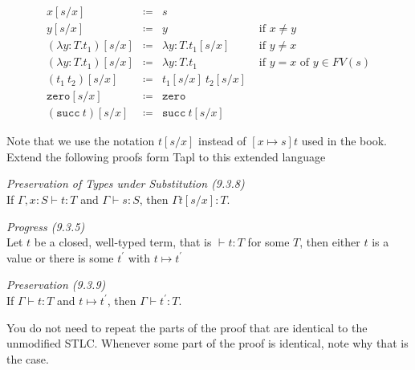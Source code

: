 \begin{minipage}{\textwidth}
  \begin{minipage}{0.5\textwidth}
    \begin{prooftree}
    \end{prooftree}
  \end{minipage}
  \hfill
  \begin{minipage}{0.4\textwidth}
    \begin{prooftree}
    \end{prooftree}
  \end{minipage}
  \hfill
\end{minipage}
\hfill

\begin{minipage}{\textwidth}
  \vspace{2em}
  \[
    \begin{array}{lcrr }
      x[s/x] & \coloneq & s\\
      y[s/x] & \coloneq & y & \text{ if } x\neq y\\
      (\lambda y:T.t_1)[s/x] & \coloneq & \lambda y:T. t_1[s/x] & \text{ if } y\neq x\\
      (\lambda y:T.t_1)[s/x] & \coloneq & \lambda y:T.t_1 & \text{ if } y=x \text{ of } y\in FV(s)\\
      (t_1\ t_2)[s/x] & \coloneq & t_1[s/x]\ t_2[s/x]\\
      \mathtt{zero}[s/x] & \coloneq & \mathtt{zero}\\
      (\mathtt{succ}\ t)[s/x] & \coloneq & \mathtt{succ}\ t[s/x]
    \end{array}
  \]
  \hfill \vspace{1em}
\end{minipage}
Note that we use the notation $t[s/x]$ instead of $[x\mapsto s]t$ used in the book.\\
Extend the following proofs form Tapl to this extended language

\begin{theorem}\emph{Preservation of Types under Substitution (9.3.8)}\\
  If $\Gamma, x:S\vdash t:T$ and $\Gamma \vdash s:S$, then $\Gamma t[s/x]:T$.
\end{theorem}
\begin{theorem}\emph{Progress (9.3.5)}\\
  Let $t$ be a closed, well-typed term, that is $\vdash t:T$ for some $T$, then either $t$ is a value or there is some $t^{\prime}$ with $t\mapsto t^{\prime}$
\end{theorem}
\begin{theorem}\emph{Preservation (9.3.9)}\\
  If $\Gamma\vdash t:T$ and $t\mapsto t^{\prime}$, then $\Gamma \vdash t^{\prime}:T$.
\end{theorem}
You do not need to repeat the parts of the proof that are identical to the unmodified STLC.
Whenever some part of the proof is identical, note why that is the case.

